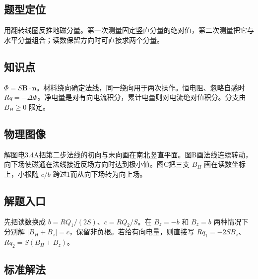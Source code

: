 \documentclass[UTF8,fontset=fandol,a4paper,11pt]{ctexart}
\newcommand{\vect}[1]{\bm{#1}}
\begin{document}


\subsection*{题型定位}

用翻转线圈反推地磁分量。第一次测量固定竖直分量的绝对值，第二次测量把它与水平分量组合；读数保留方向时可直接求两个分量。



\subsection*{知识点}

$\Phi=S\vect B\cdot\vect n$。材料绕向确定法线，同一绕向用于两次操作。恒电阻、忽略自感时 $Rq=-\Delta\Phi$。净电量是对有向电流积分，累计电量则对电流绝对值积分。分支由 $B_H\ge0$ 限定。



\subsection*{物理图像}

解图电3.4A把第二步法线的初向与末向画在南北竖直平面。图B画法线连续转动，向下场使磁通在法线接近反场方向时达到极小值。图C把三支 $B_H$ 画在读数坐标上，小根随 $c/b$ 跨过1而从向下场转为向上场。



\subsection*{解题入口}

先把读数换成 $b=RQ_1/(2S)$、$c=RQ_2/S$。在 $B_z=-b$ 和 $B_z=b$ 两种情况下分别解 $|B_H+B_z|=c$，保留非负根。若给有向电量，则直接写 $Rq_1=-2SB_z$、$Rq_2=S(B_H+B_z)$。


\subsection*{标准解法}
\end{document}
